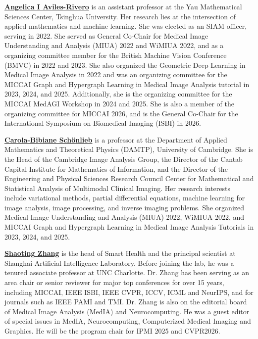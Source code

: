 \documentclass{article}
\begin{document}
\noindent
\textbf{\href{https://angelicaiaviles.wordpress.com/}{Angelica I Aviles-Rivero}} is an assistant professor at the Yau Mathematical Sciences Center, Tsinghua University. %
Her research lies at the intersection of applied mathematics and machine learning.%
She was elected as an SIAM officer, serving in 2022. 
She served as General Co-Chair for Medical Image Understanding and Analysis (MIUA) 2022 and WiMIUA 2022, and as a organizing committee member for the British Machine Vision Conference (BMVC) in 2022 and 2023. She also organized the Geometric Deep Learning in Medical Image Analysis in 2022 and was an organizing committee for the MICCAI Graph and Hypergraph Learning in Medical Image Analysis tutorial in 2023, 2024, and 2025. Additionally, she is the organizing committee for the MICCAI  MedAGI Workshop in 2024 and 2025. %
She is also a member of the organizing committee for MICCAI 2026, and is the General Co-Chair for the International Symposium on Biomedical Imaging (ISBI) in 2026.

\noindent
\textbf{\href{https://www.damtp.cam.ac.uk/person/cbs31}{Carola-Bibiane Schönlieb}} is a professor at the Department of Applied Mathematics and Theoretical Physics (DAMTP), University of Cambridge. She is the Head of the Cambridge Image Analysis Group, the Director of the Cantab Capital Institute for Mathematics of Information, and the Director of the Engineering and Physical Sciences Research Council Center for Mathematical and Statistical Analysis of Multimodal Clinical Imaging. Her research interests include variational methods, partial differential equations, machine learning for image analysis, image processing, and inverse imaging problems. She organized Medical Image Understanding and Analysis (MIUA) 2022, WiMIUA 2022, and MICCAI Graph and Hypergraph Learning in Medical Image Analysis Tutorials in 2023, 2024, and 2025.

\noindent
\textbf{\href{https://scholar.google.com/citations?user=oiBMWK4AAAAJ\&hl=zh-TW}{Shaoting Zhang}} is the head of Smart Health and the principal scientist at Shanghai Artificial Intelligence Laboratory. Before joining the lab, he was a tenured associate professor at UNC Charlotte. Dr. Zhang has been serving as an area chair or senior reviewer for major top conferences for over 15 years, including MICCAI, IEEE ISBI, IEEE CVPR, ICCV, ICML and NeurIPS, and for journals such as IEEE PAMI and TMI. Dr. Zhang is also on the editorial board of Medical Image Analysis (MedIA) and Neurocomputing. He was a guest editor of special issues in MedIA, Neurocomputing, Computerized Medical Imaging and Graphics.  He will be the program chair for IPMI 2025 and CVPR2026.
\end{document}
